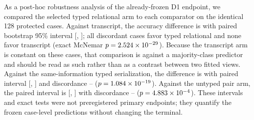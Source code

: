 As a post-hoc robustness analysis of the already-frozen D1 endpoint, we compared the selected typed relational arm to each comparator on the identical 128 protected cases. Against transcript, the accuracy difference is \DOneTypedMinusTranscript{} with paired bootstrap 95\% interval [\DOneTranscriptPairedCILow, \DOneTranscriptPairedCIHigh]; all \DOneTranscriptDiscordantWins{} discordant cases favor typed relational and none favor transcript (exact McNemar $p=2.524\times 10^{-29}$). Because the transcript arm is constant on these cases, that comparison is against a majority-class predictor and should be read as such rather than as a contrast between two fitted views. Against the same-information typed serialization, the difference is \DOneTypedMinusSerialized{} with paired interval [\DOneSerializedPairedCILow, \DOneSerializedPairedCIHigh] and discordance \DOneSerializedDiscordantWins{}--\DOneSerializedDiscordantLosses{} ($p=1.084\times 10^{-19}$). Against the untyped pair arm, the paired interval is [\DOneUntypedPairedCILow, \DOneUntypedPairedCIHigh] with discordance \DOneUntypedDiscordantWins{}--\DOneUntypedDiscordantLosses{} ($p=4.883\times 10^{-4}$). These intervals and exact tests were not preregistered primary endpoints; they quantify the frozen case-level predictions without changing the terminal.

